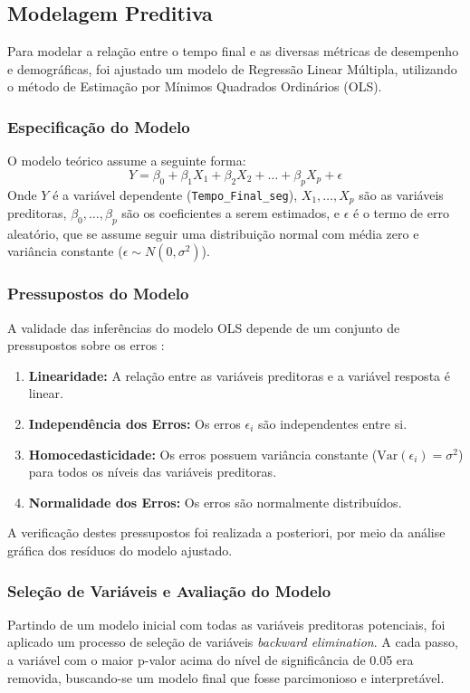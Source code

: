 \subsection{Modelagem Preditiva}
Para modelar a relação entre o tempo final e as diversas métricas de desempenho e demográficas, foi ajustado um modelo de Regressão Linear Múltipla, utilizando o método de Estimação por Mínimos Quadrados Ordinários (OLS).

\subsubsection{Especificação do Modelo}
O modelo teórico assume a seguinte forma:
$$ Y = \beta_0 + \beta_1 X_1 + \beta_2 X_2 + \dots + \beta_p X_p + \epsilon $$
Onde $Y$ é a variável dependente (\texttt{Tempo\_Final\_seg}), $X_1, \dots, X_p$ são as variáveis preditoras, $\beta_0, \dots, \beta_p$ são os coeficientes a serem estimados, e $\epsilon$ é o termo de erro aleatório, que se assume seguir uma distribuição normal com média zero e variância constante ($\epsilon \sim N(0, \sigma^2)$).

\subsubsection{Pressupostos do Modelo}
A validade das inferências do modelo OLS depende de um conjunto de pressupostos sobre os erros \cite{montgomery2012}:
\begin{enumerate}
    \item \textbf{Linearidade:} A relação entre as variáveis preditoras e a variável resposta é linear.
    \item \textbf{Independência dos Erros:} Os erros $\epsilon_i$ são independentes entre si.
    \item \textbf{Homocedasticidade:} Os erros possuem variância constante ($\text{Var}(\epsilon_i) = \sigma^2$) para todos os níveis das variáveis preditoras.
    \item \textbf{Normalidade dos Erros:} Os erros são normalmente distribuídos.
\end{enumerate}
A verificação destes pressupostos foi realizada a posteriori, por meio da análise gráfica dos resíduos do modelo ajustado.

\subsubsection{Seleção de Variáveis e Avaliação do Modelo}
Partindo de um modelo inicial com todas as variáveis preditoras potenciais, foi aplicado um processo de seleção de variáveis \textit{backward elimination}. A cada passo, a variável com o maior p-valor acima do nível de significância de 0.05 era removida, buscando-se um modelo final que fosse parcimonioso e interpretável.

